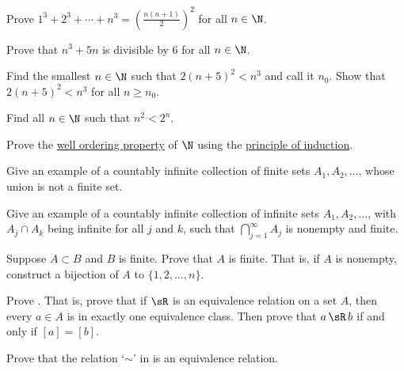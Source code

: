 \begin{exercise}
Prove $1^3 + 2^3 + \cdots + n^3 = {\left( \frac{n(n+1)}{2} \right)}^2$
for all $n \in \N$.
\end{exercise}

\begin{exercise}
Prove that $n^3 + 5n$ is divisible by $6$ for all $n \in \N$.
\end{exercise}

\begin{exercise}
Find the smallest $n \in \N$ such that $2{(n+5)}^2 < n^3$ and call it $n_0$.
Show that $2{(n+5)}^2 < n^3$ for all $n \geq n_0$.
\end{exercise}

\begin{exercise}
Find all $n \in \N$ such that $n^2 < 2^n$.
\end{exercise}

\begin{exercise}
Prove the 
\hyperlink{wop:link}{well ordering property} of $\N$ using the
\hyperref[induction:thm]{principle of induction}.
\end{exercise}


\begin{exercise}
Give an example of a countably infinite collection of finite sets $A_1, A_2, \ldots$,
whose union is not a finite set.
\end{exercise}

\begin{exercise}
Give an example of a countably infinite collection of infinite sets $A_1, A_2, \ldots$,
with $A_j \cap A_k$ being infinite for all $j$ and $k$, such that
$\bigcap_{j=1}^\infty A_j$
is nonempty and finite.
\end{exercise}

\begin{exercise}
Suppose $A \subset B$ and $B$ is finite. Prove that $A$ is finite.
That is, if $A$ is nonempty, construct a bijection of $A$ to $\{ 1,2,\ldots,n \}$.
\end{exercise}

\begin{exercise}
Prove .  That is, prove that if $\sR$ is an
equivalence relation on a set $A$, then every $a \in A$ is in exactly one
equivalence class.  Then prove that $a \, \sR \, b$ if and only if $[a] =
[b]$.
\end{exercise}

\begin{exercise}
Prove that the relation `$\sim$'
in  is an equivalence
relation.
\end{exercise}

